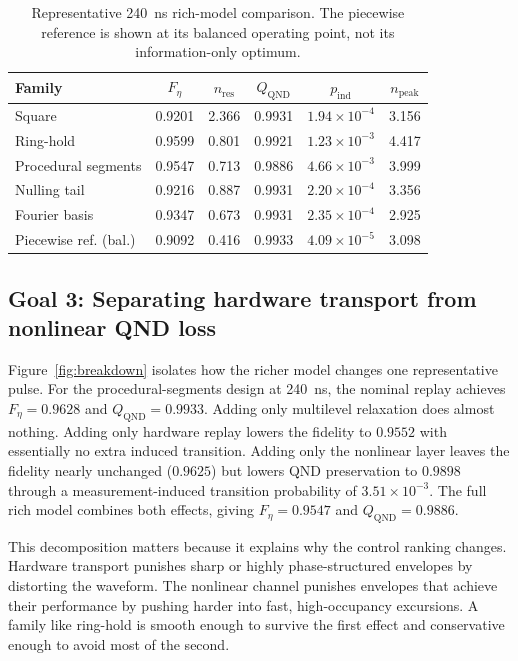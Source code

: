 \documentclass[11pt, a4paper]{article}
\begin{document}
\begin{table}[H]
  \centering
  \small
  \caption{Representative \SI{240}{ns} rich-model comparison. The piecewise reference is
  shown at its balanced operating point, not its information-only optimum.}
  \label{tab:representative}
  \begin{tabular}{@{} l c c c c c @{} }
    \toprule
    Family & $F_\eta$ & $n_{\mathrm{res}}$ & $Q_{\mathrm{QND}}$ & $p_{\mathrm{ind}}$ & $n_{\mathrm{peak}}$ \\
    \midrule
    Square & 0.9201 & 2.366 & 0.9931 & $1.94\times10^{-4}$ & 3.156 \\
    Ring-hold & 0.9599 & 0.801 & 0.9921 & $1.23\times10^{-3}$ & 4.417 \\
    Procedural segments & 0.9547 & 0.713 & 0.9886 & $4.66\times10^{-3}$ & 3.999 \\
    Nulling tail & 0.9216 & 0.887 & 0.9931 & $2.20\times10^{-4}$ & 3.356 \\
    Fourier basis & 0.9347 & 0.673 & 0.9931 & $2.35\times10^{-4}$ & 2.925 \\
    Piecewise ref. (bal.) & 0.9092 & 0.416 & 0.9933 & $4.09\times10^{-5}$ & 3.098 \\
    \bottomrule
  \end{tabular}
  \normalsize
\end{table}

\subsection{Goal 3: Separating hardware transport from nonlinear QND loss}
Figure~\ref{fig:breakdown} isolates how the richer model changes one representative pulse.
For the procedural-segments design at \SI{240}{ns}, the nominal replay achieves
$F_\eta = 0.9628$ and $Q_{\mathrm{QND}} = 0.9933$. Adding only multilevel relaxation does
almost nothing. Adding only hardware replay lowers the fidelity to $0.9552$ with
essentially no extra induced transition. Adding only the nonlinear layer leaves the
fidelity nearly unchanged ($0.9625$) but lowers QND preservation to $0.9898$ through a
measurement-induced transition probability of $3.51\times10^{-3}$. The full rich model
combines both effects, giving $F_\eta = 0.9547$ and
$Q_{\mathrm{QND}} = 0.9886$.

This decomposition matters because it explains why the control ranking changes. Hardware
transport punishes sharp or highly phase-structured envelopes by distorting the waveform.
The nonlinear channel punishes envelopes that achieve their performance by pushing harder
into fast, high-occupancy excursions. A family like ring-hold is smooth enough
to survive the first effect and conservative enough to avoid most of the second.
\end{document}
